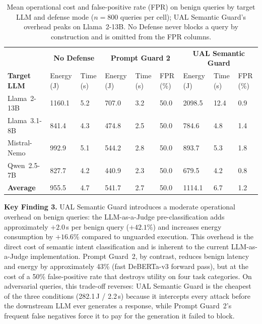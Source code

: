 \begin{table}[t]
\small
\centering
\caption{Mean operational cost and false-positive rate (FPR) on benign queries by target LLM and defense mode ($n{=}800$ queries per cell); UAL Semantic Guard's overhead peaks on Llama~2-13B. No Defense never blocks a query by construction and is omitted from the FPR columns.}
\label{tab:cost_benign_by_model}
\begin{tabularx}{\linewidth}{lXXXXXXXX}
\toprule
& \multicolumn{2}{c}{\textbf{No Defense}} & \multicolumn{3}{c}{\textbf{Prompt Guard 2}} & \multicolumn{3}{c}{\textbf{UAL Semantic Guard}} \\
\textbf{Target LLM} & Energy (J) & Time (s) & Energy (J) & Time (s) & FPR (\%) & Energy (J) & Time (s) & FPR (\%) \\
\midrule
Llama~2-13B   & 1160.1 & 5.2  & 707.0 & 3.2 & 50.0 & 2098.5 & 12.4 & 0.9 \\
Llama~3.1-8B  & 841.4  & 4.3  & 474.8 & 2.5 & 50.0 & 784.6  & 4.8  & 1.4 \\
Mistral-Nemo  & 992.9  & 5.1  & 544.2 & 2.8 & 50.0 & 893.7  & 5.3  & 1.8 \\
Qwen~2.5-7B   & 827.7  & 4.2  & 440.9 & 2.3 & 50.0 & 679.5  & 4.2  & 0.8 \\
\midrule
\textbf{Average} & 955.5 & 4.7 & 541.7 & 2.7 & 50.0 & 1114.1 & 6.7 & 1.2 \\
\bottomrule
\end{tabularx}
\end{table}

\begin{keyfinding}
\textbf{Key Finding 3.} UAL Semantic Guard introduces a moderate operational overhead on benign queries: the LLM-as-a-Judge pre-classification adds approximately $+2.0$\,s per benign query ($+42.1\%$) and increases energy consumption by $+16.6\%$ compared to unguarded execution. This overhead is the direct cost of semantic intent classification and is inherent to the current LLM-as-a-Judge implementation. Prompt Guard~2, by contrast, reduces benign latency and energy by approximately 43\% (fast DeBERTa-v3 forward pass), but at the cost of a 50\% false-positive rate that destroys utility on four task categories. On adversarial queries, this trade-off reverses: UAL Semantic Guard is the cheapest of the three conditions (282.1\,J / 2.2\,s) because it intercepts every attack before the downstream LLM ever generates a response, while Prompt Guard~2's frequent false negatives force it to pay for the generation it failed to block.
\end{keyfinding}


